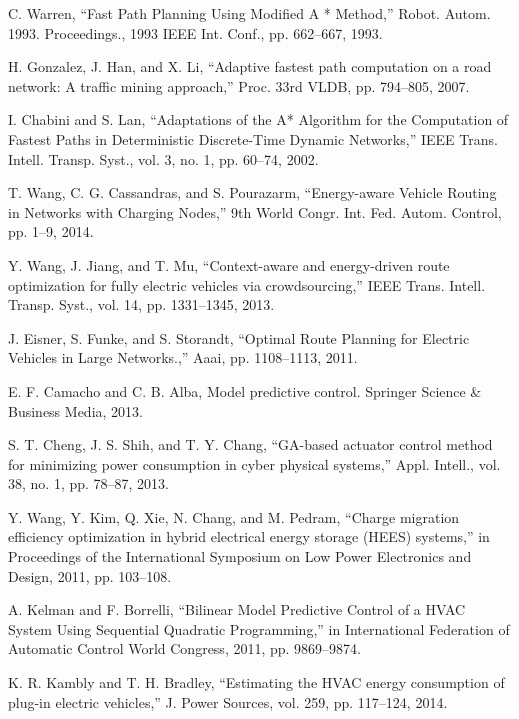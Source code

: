 	C. Warren, ``Fast Path Planning Using Modified A * Method,'' Robot. Autom. 1993. Proceedings., 1993 IEEE Int. Conf., pp. 662–667, 1993.

	H. Gonzalez, J. Han, and X. Li, ``Adaptive fastest path computation on a road network: A traffic mining approach,'' Proc. 33rd VLDB, pp. 794–805, 2007.

	I. Chabini and S. Lan, ``Adaptations of the A* Algorithm for the Computation of Fastest Paths in Deterministic Discrete-Time Dynamic Networks,'' IEEE Trans. Intell. Transp. Syst., vol. 3, no. 1, pp. 60–74, 2002.

	T. Wang, C. G. Cassandras, and S. Pourazarm, ``Energy-aware Vehicle Routing in Networks with Charging Nodes,'' 9th World Congr. Int. Fed. Autom. Control, pp. 1–9, 2014.

	Y. Wang, J. Jiang, and T. Mu, ``Context-aware and energy-driven route optimization for fully electric vehicles via crowdsourcing,'' IEEE Trans. Intell. Transp. Syst., vol. 14, pp. 1331–1345, 2013.

	J. Eisner, S. Funke, and S. Storandt, ``Optimal Route Planning for Electric Vehicles in Large Networks.,'' Aaai, pp. 1108–1113, 2011.

	E. F. Camacho and C. B. Alba, Model predictive control. Springer Science \& Business Media, 2013.

	S. T. Cheng, J. S. Shih, and T. Y. Chang, ``GA-based actuator control method for minimizing power consumption in cyber physical systems,'' Appl. Intell., vol. 38, no. 1, pp. 78–87, 2013.

	Y. Wang, Y. Kim, Q. Xie, N. Chang, and M. Pedram, ``Charge migration efficiency optimization in hybrid electrical energy storage (HEES) systems,'' in Proceedings of the International Symposium on Low Power Electronics and Design, 2011, pp. 103–108.






A. Kelman and F. Borrelli, ``Bilinear Model Predictive Control of a HVAC System Using Sequential Quadratic Programming,'' in International Federation of Automatic Control World Congress, 2011, pp. 9869–9874.

K. R. Kambly and T. H. Bradley, ``Estimating the HVAC energy consumption of plug-in electric vehicles,'' J. Power Sources, vol. 259, pp. 117–124, 2014.

